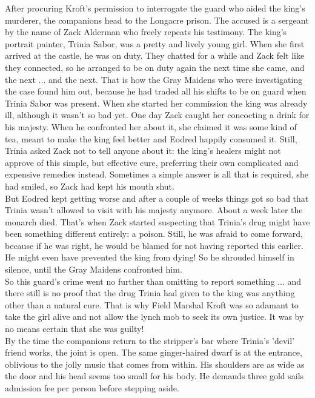 After procuring Kroft's permission to interrogate the guard who aided the king's murderer, the companions head to the Longacre prison. The accused is a sergeant by the name of Zack Alderman who freely repeats his testimony. The king's portrait painter, Trinia Sabor, was a pretty and lively young girl. When she first arrived at the castle, he was on duty. They chatted for a while and Zack felt like they connected, so he arranged to be on duty again the next time she came, and the next ... and the next. That is how the Gray Maidens who were investigating the case found him out, because he had traded all his shifts to be on guard when Trinia Sabor was present. When she started her commission the king was already ill, although it wasn't so bad yet. One day Zack caught her concocting a drink for his majesty. When he confronted her about it, she claimed it was some kind of tea, meant to make the king feel better and Eodred happily consumed it. Still, Trinia asked Zack not to tell anyone about it: the king's healers might not approve of this simple, but effective cure, preferring their own complicated and expensive remedies instead. Sometimes a simple answer is all that is required, she had smiled, so Zack had kept his mouth shut.\\

But Eodred kept getting worse and after a couple of weeks things got so bad that Trinia wasn't allowed to visit with his majesty anymore. About a week later the monarch died. That's when Zack started suspecting that Trinia's drug might have been something different entirely: a poison. Still, he was afraid to come forward, because if he was right, he would be blamed for not having reported this earlier. He might even have prevented the king from dying! So he shrouded himself in silence, until the Gray Maidens confronted him.\\

So this guard's crime went no further than omitting to report something ... and there still is no proof that the drug Trinia had given to the king was anything other than a natural cure. That is why Field Marshal Kroft was so adamant to take the girl alive and not allow the lynch mob to seek its own justice. It was by no means certain that she was guilty!\\

By the time the companions return to the stripper's bar where Trinia's 'devil' friend works, the joint is open. The same ginger-haired dwarf is at the entrance, oblivious to the jolly music that comes from within. His shoulders are as wide as the door and his head seems too small for his body. He demands three gold sails admission fee per person before stepping aside.\\

